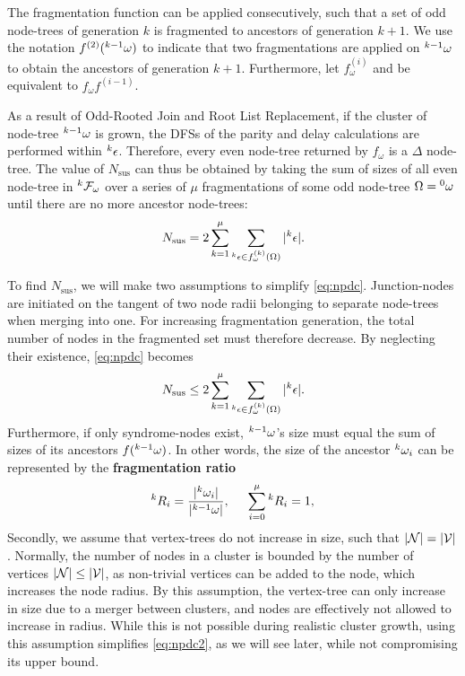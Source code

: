 The fragmentation function can be applied consecutively, such that a set of odd node-trees of generation $k$ is fragmented to ancestors of generation $k+1$. We use the notation $f^{(2)}({}^{k-1}\omega)$ to indicate that two fragmentations are applied on ${}^{k-1}\omega$ to obtain the ancestors of generation $k+1$. Furthermore, let $f_\omega^{(i)}$ and be equivalent to $f_\omega f^{(i-1)}$. 

As a result of Odd-Rooted Join and Root List Replacement, if the cluster of node-tree ${}^{k-1}\omega$ is grown, the DFSs of the parity and delay calculations are performed within ${}^{k}\epsilon$. Therefore, every even node-tree returned by $f_\omega$ is a $\Delta$ node-tree. The value of $N_{\text{sus}}$ can thus be obtained by taking the sum of sizes of all even node-tree in ${}^{k}\mathcal{F}_\omega$ over a series of $\mu$ fragmentations of some odd node-tree $\Omega = {}^{0}\omega$ until there are no more ancestor node-trees:
\begin{equation}\label{eq:npdc}
  N_{\text{sus}} = 2\sum_{k=1}^\mu{ \sum_{ \pre{k}\epsilon \in f_\omega^{(k)}(\Omega) }{ \abs{\pre{k}\epsilon}} }.
\end{equation}

To find $N_{\text{sus}}$, we will make two assumptions to simplify \eqref{eq:npdc}. Junction-nodes are initiated on the tangent of two node radii belonging to separate node-trees when merging into one. For increasing fragmentation generation, the total number of nodes in the fragmented set must therefore decrease. By neglecting their existence, \eqref{eq:npdc} becomes
\begin{equation}\label{eq:npdc2}
  N_{\text{sus}} \leq 2\sum_{k=1}^\mu{ \sum_{ \pre{k}\epsilon \in f_\omega^{(k)}(\Omega) }{ \abs{\pre{k}\epsilon}} }.
\end{equation}
Furthermore, if only syndrome-nodes exist, ${}^{k-1}\omega$'s size must equal the sum of sizes of its ancestors $f({}^{k-1}\omega)$. In other words, the size of the ancestor ${}^{k}\omega_i$ can be represented by the \textbf{fragmentation ratio}
\begin{equation}\label{eq:ratio}
  \pre{k}R_i = \frac{\abs{\pre{k}\omega_i}}{\abs{\pre{k-1}\omega}}, \hspace{0.5cm} \sum_{i=0}^{\mu}{\pre{k}R_i} = 1,
\end{equation}
Secondly, we assume that vertex-trees do not increase in size, such that $\lvert\mathcal{N}\rvert=\lvert\mathcal{V}\rvert$. Normally, the number of nodes in a cluster is bounded by the number of vertices $\lvert\mathcal{N}\rvert\leq \lvert\mathcal{V}\rvert$, as non-trivial vertices can be added to the node, which increases the node radius. By this assumption, the vertex-tree can only increase in size due to a merger between clusters, and nodes are effectively not allowed to increase in radius. While this is not possible during realistic cluster growth, using this assumption simplifies \eqref{eq:npdc2}, as we will see later, while not compromising its upper bound. 

